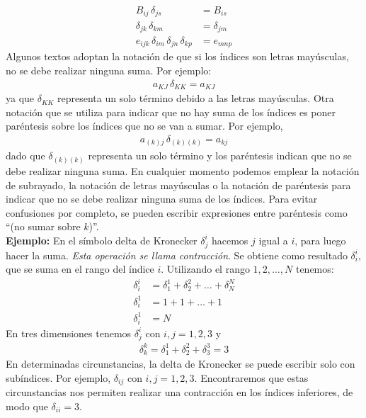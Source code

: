 \begin{align*}
B_{ij} \, \delta_{js} & = B_{is}         \\[0.5em]
\delta_{jk} \, \delta_{km} &= \delta_{jm} \\[0.5em]
e_{ijk} \, \delta_{im} \, \delta_{jn} \, \delta_{kp} &= e_{mnp}
\end{align*}
Algunos textos adoptan la notación de que si los índices son letras mayúsculas, no se debe realizar ninguna suma. Por ejemplo:
\begin{align*}
a_{KJ} \, \delta_{KK} = a_{KJ}
\end{align*}
ya que $\delta_{KK}$ representa un solo término debido a las letras mayúsculas. Otra notación que se utiliza para indicar que no hay suma de los índices es poner paréntesis sobre los índices que no se van a sumar. Por ejemplo,
\begin{align*}
a_{(k) j} \, \delta_{(k) (k)} = a_{kj}
\end{align*}
dado que $\delta_{(k) (k)}$ representa un solo término y los paréntesis indican que no se debe realizar ninguna suma. En cualquier momento podemos emplear la notación de subrayado, la notación de letras mayúsculas o la notación de paréntesis para indicar que no se debe realizar ninguna suma de los índices. Para evitar confusiones por completo, se pueden escribir expresiones entre paréntesis como \enquote{(no sumar sobre $k$)}.
\\[0.5em]
\noindent
\textbf{Ejemplo: } En el símbolo delta de Kronecker $\delta_{j}^{i}$ hacemos $j$ igual a $i$, para luego hacer la suma. \emph{Esta operación se llama contracción}. Se obtiene como resultado $\delta_{i}^{i}$, que se suma en el rango del índice $i$. Utilizando el rango $1, 2, \ldots, N$ tenemos:
\begin{align*}
\delta_{i}^{i} & = \delta_{1}^{1} + \delta_{2}^{2} + \ldots + \delta_{N}^{N} \\[0.5em]
\delta_{i}^{1} & = 1 + 1 + \ldots +  1                                       \\[0.em]
\delta_{i}^{1} & = N
\end{align*}
En tres dimensiones tenemos $\delta_{j}^{i}$ con $i, j = 1, 2, 3$ y
\begin{align*}
\delta_{k}^{k} = \delta_{1}^{1} + \delta_{2}^{2} + \delta_{3}^{3} = 3
\end{align*}
En determinadas circunstancias, la delta de Kronecker se puede escribir solo con subíndices. Por ejemplo, $\delta_{ij}$ con $i, j = 1, 2, 3$. Encontraremos que estas circunstancias nos permiten realizar una contracción en los índices inferiores, de modo que $\delta_{ii} = 3$.
